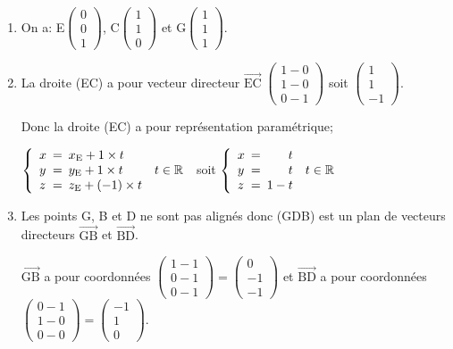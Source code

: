 \documentclass[10pt]{article}
\providecommand{\R}{\mathbb{R}}
\providecommand{\vectt}[1]{\overrightarrow{\mathrm{#1}}}
\begin{document}
\begin{enumerate}
\item 
On a:
E\;$\begin{pmatrix} 0\\0\\1\end{pmatrix}$,
C\;$\begin{pmatrix} 1\\1\\0\end{pmatrix}$ et
G\;$\begin{pmatrix} 1\\1\\1\end{pmatrix}$.

\item La droite (EC) a pour vecteur directeur 
$\vectt{EC}\;\begin{pmatrix} 1-0\\1-0\\0-1\end{pmatrix}$
soit $\begin{pmatrix} 1\\1\\-1\end{pmatrix}$.

Donc la droite (EC) a pour représentation paramétrique;

$\left\{
\begin{array}{l !{=} l l}
x & x_{\text E} + 1\times t\\
y & y_{\text E} + 1\times t & t\in\R\\
z & z_{\text E} + (-1)\times t
\end{array}
\right.$
soit
$\left\{
\begin{array}{l !{=} r l}
x & t\\
y & t & t\in\R\\
z & 1- t
\end{array}
\right.$

\item 
Les points G, B et D ne sont pas alignés donc (GDB) est un plan de vecteurs directeurs $\vectt{GB}$ et $\vectt{BD}$.

$\vectt{GB}$ a pour coordonnées
$\begin{pmatrix} 1-1\\0-1\\0-1 \end{pmatrix}
=
\begin{pmatrix}0\\-1\\-1 \end{pmatrix}$
et
$\vectt{BD}$ a pour coordonnées
$\begin{pmatrix} 0-1\\1-0\\0-0 \end{pmatrix}
=
\begin{pmatrix}-1\\1\\0 \end{pmatrix}$.


\end{enumerate}
\end{document}
